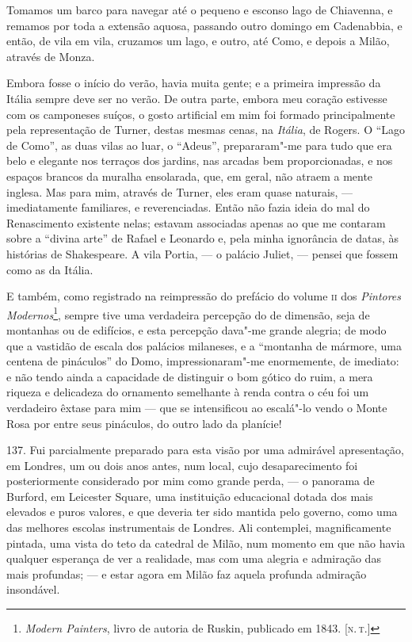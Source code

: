 Tomamos um barco para navegar até o pequeno e esconso lago de Chiavenna,
e remamos por toda a extensão aquosa, passando outro domingo em
Cadenabbia, e então, de vila em vila, cruzamos um lago, e outro, até
Como, e depois a Milão, através de Monza.

Embora fosse o início do verão, havia muita gente; e a primeira
impressão da Itália sempre deve ser no verão. De outra parte, embora meu
coração estivesse com os camponeses suíços, o gosto artificial em mim
foi formado principalmente pela representação de Turner, destas mesmas
cenas, na \emph{Itália}, de Rogers. O ``Lago de Como'', as duas vilas ao
luar, o ``Adeus'', prepararam"-me para tudo que era belo e elegante nos
terraços dos jardins, nas arcadas bem proporcionadas, e nos espaços
brancos da muralha ensolarada, que, em geral, não atraem a mente
inglesa. Mas para mim, através de Turner, eles eram quase naturais, ---
imediatamente familiares, e reverenciadas. Então não fazia ideia do mal
do Renascimento existente nelas; estavam associadas apenas ao que me
contaram sobre a ``divina arte'' de Rafael e Leonardo e, pela minha
ignorância de datas, às histórias de Shakespeare. A vila Portia, --- o
palácio Juliet, --- pensei que fossem como as da Itália.

E também, como registrado na reimpressão do prefácio do volume \textsc{ii} dos
\emph{Pintores Modernos}\footnote{\emph{Modern Painters}, livro de
  autoria de Ruskin, publicado em 1843. {[}\textsc{n.\,t.}{]}}, sempre tive uma
verdadeira percepção do de dimensão, seja de montanhas ou de edifícios,
e esta percepção dava"-me grande alegria; de modo que a vastidão de
escala dos palácios milaneses, e a ``montanha de mármore, uma centena de
pináculos'' do Domo, impressionaram"-me enormemente, de imediato: e não
tendo ainda a capacidade de distinguir o bom gótico do ruim, a mera
riqueza e delicadeza do ornamento semelhante à renda contra o céu foi um
verdadeiro êxtase para mim --- que se intensificou ao escalá"-lo vendo o
Monte Rosa por entre seus pináculos, do outro lado da planície!

137. Fui parcialmente preparado para esta visão por uma admirável
apresentação, em Londres, um ou dois anos antes, num local, cujo
desaparecimento foi posteriormente considerado por mim como grande
perda, --- o panorama de Burford, em Leicester Square, uma instituição
educacional dotada dos mais elevados e puros valores, e que deveria ter
sido mantida pelo governo, como uma das melhores escolas instrumentais
de Londres. Ali contemplei, magnificamente pintada, uma vista do teto da
catedral de Milão, num momento em que não havia qualquer esperança de
ver a realidade, mas com uma alegria e admiração das mais profundas; ---
e estar agora em Milão faz aquela profunda admiração insondável.

